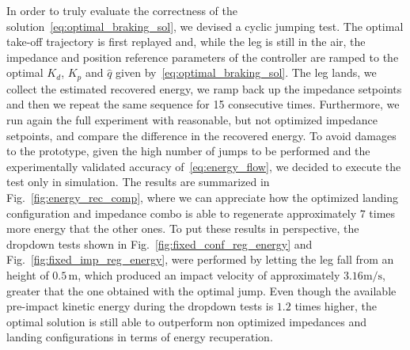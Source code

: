In order to truly evaluate the correctness of the solution~\eqref{eq:optimal_braking_sol}, we devised a cyclic jumping test. The optimal take-off trajectory is first replayed and, while the leg is still in the air, the impedance and position reference parameters of the controller are ramped to the optimal $K_d$, $K_p$ and $\hat{q}$ given by~\eqref{eq:optimal_braking_sol}. The leg lands, we collect the estimated recovered energy, we ramp back up the impedance setpoints and then we repeat the same sequence for 15 consecutive times. Furthermore, we run again the full experiment with reasonable, but not optimized impedance setpoints, and compare the difference in the recovered energy. To avoid damages to the prototype, given the high number of jumps to be performed and the experimentally validated accuracy of~\eqref{eq:energy_flow}, we decided to execute the test only in simulation. The results are summarized in Fig.~\ref{fig:energy_rec_comp}, where we can appreciate how the optimized landing configuration and impedance combo is able to regenerate approximately $7$ times more energy that the other ones. To put these results in perspective, the dropdown tests shown in Fig.~\ref{fig:fixed_conf_reg_energy} and Fig.~\ref{fig:fixed_imp_reg_energy}, were performed by letting the leg fall from an height of $0.5\,\mathrm{m}$, which produced an impact velocity of approximately $3.16\mathrm{m/s}$, greater that the one obtained with the optimal jump. Even though the available pre-impact kinetic energy during the dropdown tests is $1.2$ times higher, the optimal solution is still able to outperform non optimized impedances and landing configurations in terms of energy recuperation.